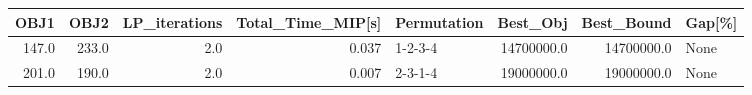 \begin{tabular}{rrrrlrrl}
\toprule
  OBJ1 &   OBJ2 &  LP\_iterations &  Total\_Time\_MIP[s] & Permutation &    Best\_Obj &  Best\_Bound & Gap[\%] \\
\midrule
 147.0 &  233.0 &            2.0 &              0.037 &     1-2-3-4 &  14700000.0 &  14700000.0 &   None \\
 201.0 &  190.0 &            2.0 &              0.007 &     2-3-1-4 &  19000000.0 &  19000000.0 &   None \\
\bottomrule
\end{tabular}
